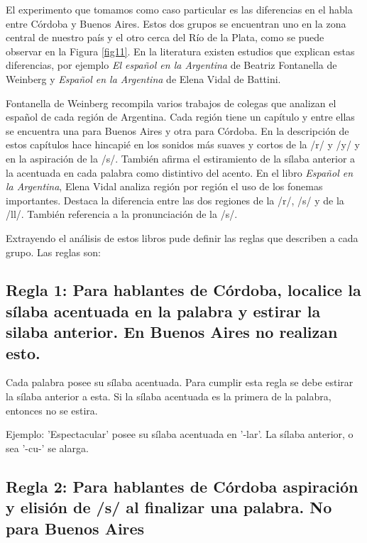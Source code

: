 El experimento que tomamos como caso particular es las diferencias en el habla entre Córdoba y Buenos Aires. Estos dos grupos se encuentran uno en la zona central de nuestro país y el otro cerca del Río de la Plata, como se puede observar en la Figura \ref{fig11}. En la literatura existen estudios que explican estas diferencias, por ejemplo \textit{El español en la Argentina} de Beatriz Fontanella de Weinberg  y \textit{Español en la Argentina} de Elena Vidal de Battini. 

Fontanella de Weinberg recompila varios trabajos de colegas que analizan el español de cada región de Argentina. Cada región tiene un capítulo y entre ellas se encuentra una para Buenos Aires y otra para Córdoba. En la descripción de estos capítulos hace hincapié en los sonidos más suaves y cortos de la /r/ y /y/ y en la aspiración de la /s/. También afirma el estiramiento de la sílaba anterior a la acentuada en cada palabra como distintivo del acento. En el libro \textit{Español en la Argentina}, Elena Vidal analiza región por región el uso de los fonemas importantes. Destaca la diferencia entre las dos regiones de la /r/, /s/ y de la /ll/. También referencia a la pronunciación de la /s/.

Extrayendo el análisis de estos libros pude definir las reglas que describen a cada grupo. Las reglas son: 

\subsection*{Regla 1: Para hablantes de Córdoba, localice la sílaba acentuada en la palabra y estirar la silaba anterior. En Buenos Aires no realizan esto. }

Cada palabra posee su sílaba acentuada. Para cumplir esta regla se debe estirar la sílaba anterior a esta. Si la sílaba acentuada es la primera de la palabra, entonces no se estira. 

Ejemplo: 'Espectacular' posee su sílaba acentuada en '-lar'. La sílaba anterior, o sea '-cu-' se alarga. 


\subsection*{Regla 2: Para hablantes de Córdoba aspiración y elisión de /s/ al finalizar una palabra. No para Buenos Aires}

